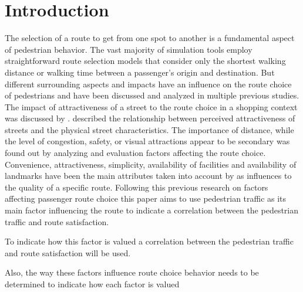 

\section{Introduction}
\label{section:Introduction}


The selection of a route to get from one spot to another is a fundamental aspect of pedestrian behavior. \autocite[]{Bierlaire2009} The vast majority of simulation tools employ straightforward route selection models that consider only the shortest walking distance or walking time between a passenger's origin and destination. \autocite[]{Daamen2005} But different surrounding aspects and impacts have an influence on the route choice of pedestrians and have been discussed and analyzed in multiple previous studies. The impact of attractiveness of a street to the route choice in a shopping context was discussed by \autocite[]{Kurose2001}. \autocite[]{Borst2008} described the relationship between perceived attractiveness of streets and the physical street characteristics. The importance of distance, while the level of congestion, safety, or visual attractions appear to be secondary was found out by \autocite[]{Morrall1985} analyzing and evaluation factors affecting the route choice. Convenience, attractiveness, simplicity, availability of facilities and availability of landmarks have been the main attributes taken into account by \autocite[]{Millonig2007} as influences to the quality of a specific route. Following this previous research on factors affecting passenger route choice this paper aims to use pedestrian traffic as its main factor influencing the route to indicate a correlation between the pedestrian traffic and route satisfaction.



To indicate how this factor is valued a correlation between the pedestrian traffic and route satisfaction will be used.





Also, the way these factors influence route choice behavior needs to be determined to indicate how each factor is valued \autocite[]{Daamen2005}




